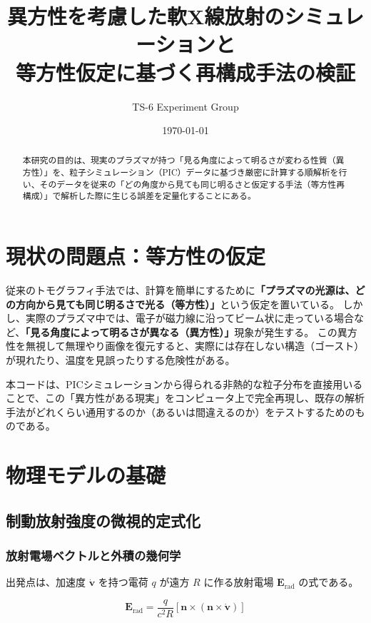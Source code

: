 \documentclass[a4paper,11pt]{bxjsarticle} %
\title{異方性を考慮した軟X線放射のシミュレーションと\\等方性仮定に基づく再構成手法の検証}
\author{TS-6 Experiment Group}
\date{\today}
\begin{document}
\maketitle

\begin{abstract}
本研究の目的は、現実のプラズマが持つ「見る角度によって明るさが変わる性質（異方性）」を、粒子シミュレーション（PIC）データに基づき厳密に計算する順解析を行い、そのデータを従来の「どの角度から見ても同じ明るさと仮定する手法（等方性再構成）」で解析した際に生じる誤差を定量化することにある。
\end{abstract}

\section{現状の問題点：等方性の仮定}
従来のトモグラフィ手法では、計算を簡単にするために\textbf{「プラズマの光源は、どの方向から見ても同じ明るさで光る（等方性）」}という仮定を置いている。
しかし、実際のプラズマ中では、電子が磁力線に沿ってビーム状に走っている場合など、\textbf{「見る角度によって明るさが異なる（異方性）」}現象が発生する。
この異方性を無視して無理やり画像を復元すると、実際には存在しない構造（ゴースト）が現れたり、温度を見誤ったりする危険性がある。

本コードは、PICシミュレーションから得られる非熱的な粒子分布を直接用いることで、この「異方性がある現実」をコンピュータ上で完全再現し、既存の解析手法がどれくらい通用するのか（あるいは間違えるのか）をテストするためのものである。

\section{物理モデルの基礎}

\subsection{制動放射強度の微視的定式化}

\subsubsection{放射電場ベクトルと外積の幾何学}

出発点は、加速度 $\dot{\bm{v}}$ を持つ電荷 $q$ が遠方 $R$ に作る放射電場 $\bm{E}_{\mathrm{rad}}$ の式である。

\begin{equation}
    \bm{E}_{\mathrm{rad}} = \frac{q}{c^2 R} \left[ \bm{n} \times (\bm{n} \times \dot{\bm{v}}) \right]
\end{equation}
\end{document}
